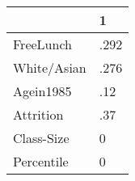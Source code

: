 \begin{table}[htbp]
\begin{tabular}{ll} \hline \hline
 & 1  \\  \hline 
FreeLunch & .292 \\  
White/Asian & .276 \\  
Agein1985 & .12 \\  
Attrition & .37 \\  
Class-Size & 0 \\  
Percentile & 0 \\  
\hline \hline \end{tabular}
\end{table}
